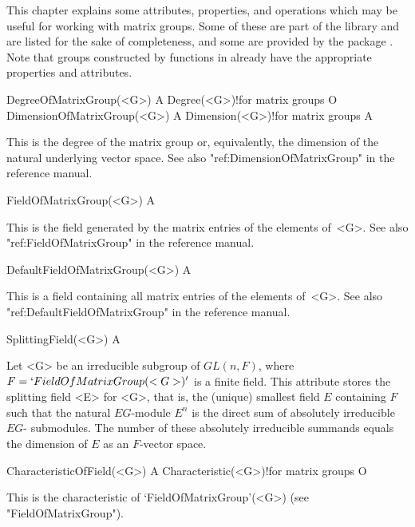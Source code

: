 


This chapter explains some attributes, properties, and operations which may
be useful for working with matrix groups. Some of these are part of the 
{\GAP} library and are listed for the sake of completeness, and some
are provided by the package {\IRREDSOL}. Note that  groups constructed
by functions in {\IRREDSOL} already have the appropriate properties and
attributes. 



\>DegreeOfMatrixGroup(<G>) A
\>Degree(<G>)!{for matrix groups} O
\>DimensionOfMatrixGroup(<G>) A
\>Dimension(<G>)!{for matrix groups} A

This is the degree of the matrix group or, equivalently, the dimension of the
natural underlying vector space. See also "ref:DimensionOfMatrixGroup" in the {\GAP} reference manual.

\>FieldOfMatrixGroup(<G>) A

This is the field generated by the matrix entries of the elements of~<G>. See also 
"ref:FieldOfMatrixGroup" in the {\GAP} reference manual.

\>DefaultFieldOfMatrixGroup(<G>) A

This is a field containing all matrix entries of the elements of~<G>. See also 
"ref:DefaultFieldOfMatrixGroup" in the {\GAP} reference manual.

\>SplittingField(<G>) A

Let <G> be an irreducible subgroup of $GL(n, F)$, where $F =  `FieldOfMatrixGroup(<G>)'$
is a finite field. This attribute stores the splitting field <E> for <G>, that is,
the (unique) smallest field $E$ containing $F$ such 
that the natural $E G$-module $E^n$ is the direct sum of absolutely irreducible $E G$-
submodules. The number of these absolutely irreducible summands equals the dimension of $E$
as an $F$-vector space.

\>CharacteristicOfField(<G>) A
\>Characteristic(<G>)!{for matrix groups} O

This is the characteristic of `FieldOfMatrixGroup'(<G>) (see "FieldOfMatrixGroup").


